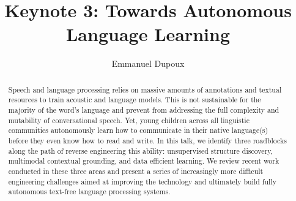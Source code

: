 \documentclass{article}
\title{Keynote 3: Towards Autonomous Language Learning}
\author{Emmanuel Dupoux}
\date{}
\begin{document}
\maketitle
\thispagestyle{empty}
\begin{abstract}
Speech and language processing relies on massive amounts of annotations and textual resources to train acoustic and language models. This is not sustainable for the majority of the word's language and prevent from addressing the full complexity and mutability of conversational speech. Yet, young children across all linguistic communities autonomously learn how to communicate in their native language(s) before they even know how to read and write. In this talk, we identify three roadblocks along the path of reverse engineering this ability: unsupervised structure discovery, multimodal contextual grounding, and data efficient learning. We review recent work conducted in these three areas and present a series of increasingly more difficult engineering challenges aimed at improving the technology and ultimately build fully autonomous text-free language processing systems.
\end{abstract}
\end{document}
